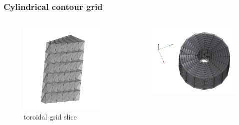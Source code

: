 \documentclass{beamer}
\begin{document}
\begin{frame}
\frametitle{Cylindrical contour grid}
\vspace{-1 cm}
\begin{columns}[onlytextwidth]
	\begin{column}{0.5\textwidth}
		\begin{center}
			\begin{figure}
				\includegraphics[trim={0 1cm 0 3cm},clip,width=1\textwidth]{FIGURES/slice_grid_rect.png}
				\caption{toroidal grid slice}
			\end{figure}
		\end{center}
	\end{column}
	\begin{column}{0.5\textwidth}
		\vspace{1.25 cm}
		\begin{center}
	\begin{figure}
		\includegraphics[trim={0 1cm 0 2cm},clip,width=1\textwidth]{FIGURES/full_grid_rect.png}

\end{figure}
\end{center}
\end{column}
\end{columns}
\end{frame}
\end{document}

